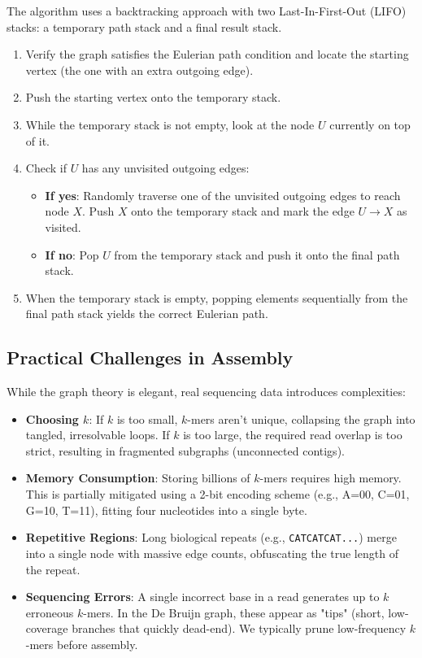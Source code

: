 \documentclass[11pt, a4paper]{article}
\begin{document}
The algorithm uses a backtracking approach with two Last-In-First-Out (LIFO) stacks: a temporary path stack and a final result stack.
\begin{enumerate}
    \item Verify the graph satisfies the Eulerian path condition and locate the starting vertex (the one with an extra outgoing edge).
    \item Push the starting vertex onto the temporary stack.
    \item While the temporary stack is not empty, look at the node $U$ currently on top of it.
    \item Check if $U$ has any unvisited outgoing edges:
    \begin{itemize}
        \item \textbf{If yes}: Randomly traverse one of the unvisited outgoing edges to reach node $X$. Push $X$ onto the temporary stack and mark the edge $U \to X$ as visited.
        \item \textbf{If no}: Pop $U$ from the temporary stack and push it onto the final path stack.
    \end{itemize}
    \item When the temporary stack is empty, popping elements sequentially from the final path stack yields the correct Eulerian path.
\end{enumerate}

\subsection{Practical Challenges in Assembly}
While the graph theory is elegant, real sequencing data introduces complexities:
\begin{itemize}
    \item \textbf{Choosing $k$}: If $k$ is too small, $k$-mers aren't unique, collapsing the graph into tangled, irresolvable loops. If $k$ is too large, the required read overlap is too strict, resulting in fragmented subgraphs (unconnected contigs).
    \item \textbf{Memory Consumption}: Storing billions of $k$-mers requires high memory. This is partially mitigated using a 2-bit encoding scheme (e.g., A=00, C=01, G=10, T=11), fitting four nucleotides into a single byte.
    \item \textbf{Repetitive Regions}: Long biological repeats (e.g., \texttt{CATCATCAT...}) merge into a single node with massive edge counts, obfuscating the true length of the repeat.
    \item \textbf{Sequencing Errors}: A single incorrect base in a read generates up to $k$ erroneous $k$-mers. In the De Bruijn graph, these appear as "tips" (short, low-coverage branches that quickly dead-end). We typically prune low-frequency $k$-mers before assembly.
\end{itemize}
\end{document}
